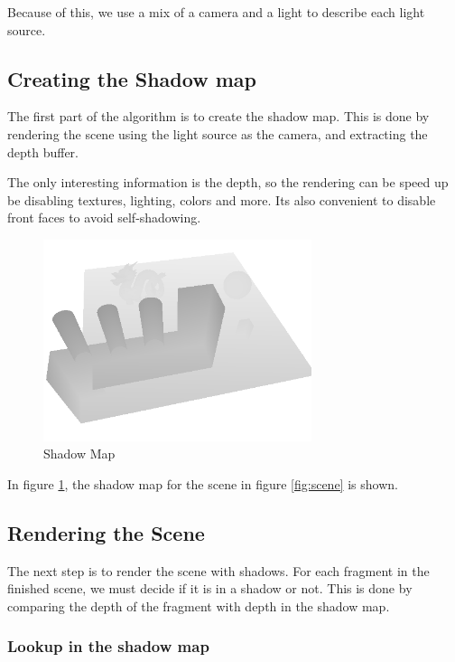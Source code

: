 Because of this, we use a mix of a camera and a light to describe each
light source. 

\subsection{Creating the Shadow map}

The first part of the algorithm is to create the shadow map. This is
done by rendering the scene using the light source as the camera, and
extracting the depth buffer.

The only interesting information is the depth, so the rendering can be
speed up be disabling textures, lighting, colors and more. Its also
convenient to disable front faces to avoid self-shadowing. %

\begin{figure}[h]
  \centering
  \includegraphics[width=0.7\textwidth]{gfx/shadowmap}  
  \caption{Shadow Map}
  \label{fig:shadowmap}
\end{figure}

In figure \ref{fig:shadowmap}, the shadow map for the scene in figure
\ref{fig:scene} is shown.

\subsection{Rendering the Scene}\label{sec:render}


The next step is to render the scene with shadows. For each fragment
in the finished scene, we must decide if it is in a shadow or
not. This is done by comparing the depth of the fragment with depth in
the shadow map.

\subsubsection*{Lookup in the shadow map}


